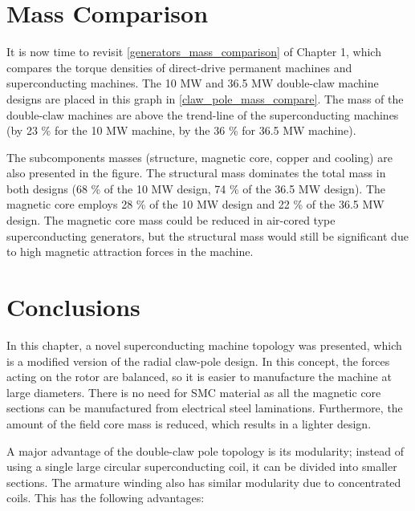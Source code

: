 \documentclass[12pt]{iopart}
\begin{document}
\section{Mass Comparison}

It is now time to revisit \ref{generators_mass_comparison} of Chapter 1, which compares the torque densities of direct-drive permanent machines and superconducting machines. The 10 MW and 36.5 MW double-claw machine designs are placed in this graph in \ref{claw_pole_mass_compare}. The mass of the double-claw machines are above the trend-line of the superconducting machines (by 23 \% for the 10 MW machine, by the 36 \% for 36.5 MW machine).

The subcomponents masses (structure, magnetic core, copper and cooling) are also presented in the figure. The structural mass dominates the total mass in both designs (68 \% of the 10 MW design, 74 \% of the 36.5 MW design). The magnetic core employs 28 \% of the 10 MW design and 22 \% of the 36.5 MW design. The magnetic core mass could be reduced in air-cored type superconducting generators, but the structural mass would still be significant due to high magnetic attraction forces in the machine.


\section{Conclusions}

In this chapter, a novel superconducting machine topology was presented, which is a modified version of the radial claw-pole design. In this concept, the forces acting on the rotor  are balanced, so it is easier to manufacture the machine at large diameters. There is no need for SMC material as all the magnetic core sections can be manufactured from electrical steel laminations. Furthermore, the amount of the field core mass is reduced, which results in a lighter design.

A major advantage of the double-claw pole topology is its modularity; instead of using a single large circular superconducting coil, it can be divided into smaller sections. The armature winding also has similar modularity due to concentrated coils. This has the following advantages:
\end{document}
